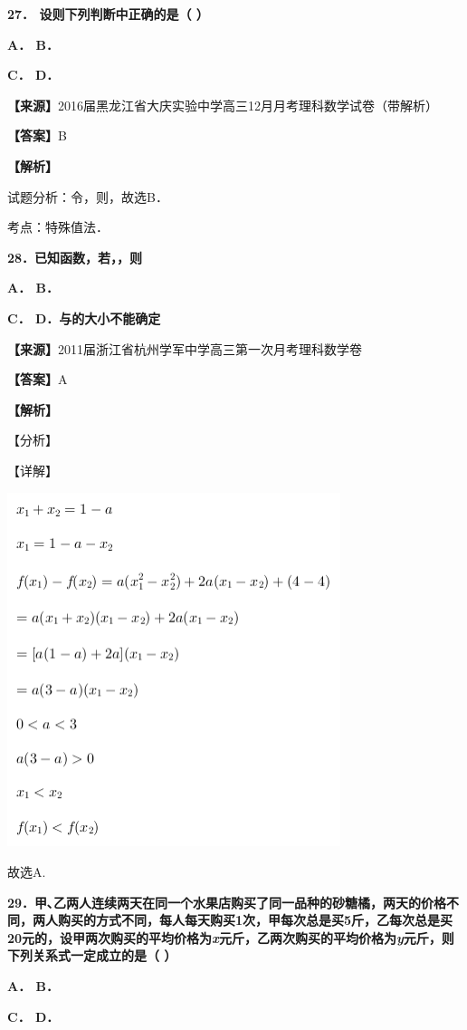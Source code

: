 \documentclass[
]{article}
\begin{document}
\textbf{27． 设则下列判断中正确的是（ ）}

\textbf{A． B．}

\textbf{C． D．}

\textbf{【来源】}2016届黑龙江省大庆实验中学高三12月月考理科数学试卷（带解析）

\textbf{【答案】}B

\textbf{【解析】}

试题分析：令，则，故选B．

考点：特殊值法．

\textbf{28．已知函数，若，，则}

\textbf{A． B．}

\textbf{C． D．与的大小不能确定}

\textbf{【来源】}2011届浙江省杭州学军中学高三第一次月考理科数学卷

\textbf{【答案】}A

\textbf{【解析】}

【分析】

【详解】

\includegraphics[width=3.83333in,height=4.07292in]{Fig//media/image305.png}

故选A.

\textbf{29．甲､乙两人连续两天在同一个水果店购买了同一品种的砂糖橘，两天的价格不同，两人购买的方式不同，每人每天购买1次，甲每次总是买5斤，乙每次总是买20元的，设甲两次购买的平均价格为\emph{x}元斤，乙两次购买的平均价格为\emph{y}元斤，则下列关系式一定成立的是（
）}

\textbf{A． B．}

\textbf{C． D．}
\end{document}
